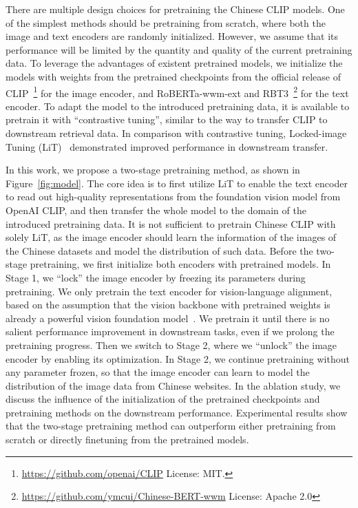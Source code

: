 There are multiple design choices for pretraining the Chinese CLIP models. 
One of the simplest methods should be pretraining from scratch, where both the image and text encoders are randomly initialized. 
However, we assume that its performance will be limited by the quantity and quality of the current pretraining data. 
To leverage the advantages of existent pretrained models, we initialize the models with weights from the pretrained checkpoints from the official release of CLIP~\footnote{\url{https://github.com/openai/CLIP} License: MIT.} for the image encoder, and RoBERTa-wwm-ext and RBT3~\footnote{\url{https://github.com/ymcui/Chinese-BERT-wwm} License: Apache 2.0} for the text encoder. 
To adapt the model to the introduced pretraining data, it is available to pretrain it with ``contrastive tuning'', similar to the way to transfer CLIP to downstream retrieval data. 
In comparison with contrastive tuning, Locked-image Tuning (LiT)~\citep{lit} demonstrated improved performance in downstream transfer. 

In this work, we propose a two-stage pretraining method, as shown in Figure~\ref{fig:model}. 
The core idea is to first utilize LiT to enable the text encoder to read out high-quality representations from the foundation vision model from OpenAI CLIP, and then transfer the whole model to the domain of the introduced pretraining data. 
It is not sufficient to pretrain Chinese CLIP with solely LiT, as the image encoder should learn the information of the images of the Chinese datasets and model the distribution of such data. 
Before the two-stage pretraining, we first initialize both encoders with pretrained models. 
In Stage 1, we ``lock'' the image encoder by freezing its parameters during pretraining. 
We only pretrain the text encoder for vision-language alignment, based on the assumption that the vision backbone with pretrained weights is already a powerful vision foundation model~\citep{lit, wukong}. 
We pretrain it until there is no salient performance improvement in downstream tasks, even if we prolong the pretraining progress. 
Then we switch to Stage 2, where we ``unlock'' the image encoder by enabling its optimization. 
In Stage 2, we continue pretraining without any parameter frozen, so that the image encoder can learn to model the distribution of the image data from Chinese websites. 
In the ablation study, we discuss the influence of the initialization of the pretrained checkpoints and pretraining methods on the downstream performance. 
Experimental results show that the two-stage pretraining method can outperform either pretraining from scratch or directly finetuning from the pretrained models. 


